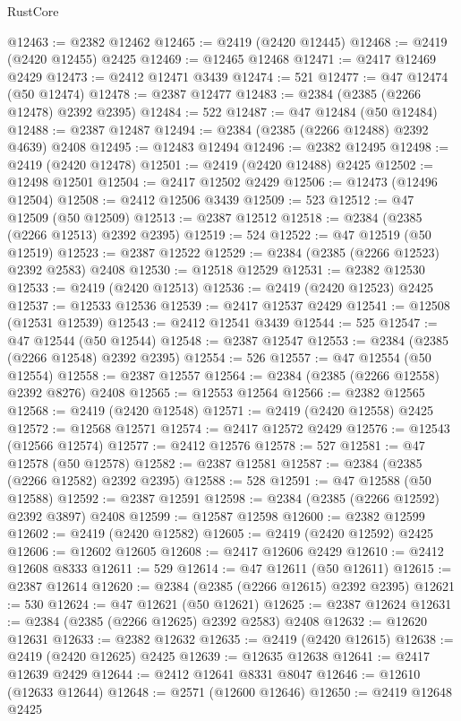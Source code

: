 \begin{lexlean}{RustCore}
\begin{coremodule}
@12463 := @2382 @12462
@12465 := @2419 (@2420 @12445)
@12468 := @2419 (@2420 @12455) @2425
@12469 := @12465 @12468
@12471 := @2417 @12469 @2429
@12473 := @2412 @12471 @3439
@12474 := 521
@12477 := @47 @12474 (@50 @12474)
@12478 := @2387 @12477
@12483 := @2384 (@2385 (@2266 @12478) @2392 @2395)
@12484 := 522
@12487 := @47 @12484 (@50 @12484)
@12488 := @2387 @12487
@12494 := @2384 (@2385 (@2266 @12488) @2392 @4639) @2408
@12495 := @12483 @12494
@12496 := @2382 @12495
@12498 := @2419 (@2420 @12478)
@12501 := @2419 (@2420 @12488) @2425
@12502 := @12498 @12501
@12504 := @2417 @12502 @2429
@12506 := @12473 (@12496 @12504)
@12508 := @2412 @12506 @3439
@12509 := 523
@12512 := @47 @12509 (@50 @12509)
@12513 := @2387 @12512
@12518 := @2384 (@2385 (@2266 @12513) @2392 @2395)
@12519 := 524
@12522 := @47 @12519 (@50 @12519)
@12523 := @2387 @12522
@12529 := @2384 (@2385 (@2266 @12523) @2392 @2583) @2408
@12530 := @12518 @12529
@12531 := @2382 @12530
@12533 := @2419 (@2420 @12513)
@12536 := @2419 (@2420 @12523) @2425
@12537 := @12533 @12536
@12539 := @2417 @12537 @2429
@12541 := @12508 (@12531 @12539)
@12543 := @2412 @12541 @3439
@12544 := 525
@12547 := @47 @12544 (@50 @12544)
@12548 := @2387 @12547
@12553 := @2384 (@2385 (@2266 @12548) @2392 @2395)
@12554 := 526
@12557 := @47 @12554 (@50 @12554)
@12558 := @2387 @12557
@12564 := @2384 (@2385 (@2266 @12558) @2392 @8276) @2408
@12565 := @12553 @12564
@12566 := @2382 @12565
@12568 := @2419 (@2420 @12548)
@12571 := @2419 (@2420 @12558) @2425
@12572 := @12568 @12571
@12574 := @2417 @12572 @2429
@12576 := @12543 (@12566 @12574)
@12577 := @2412 @12576
@12578 := 527
@12581 := @47 @12578 (@50 @12578)
@12582 := @2387 @12581
@12587 := @2384 (@2385 (@2266 @12582) @2392 @2395)
@12588 := 528
@12591 := @47 @12588 (@50 @12588)
@12592 := @2387 @12591
@12598 := @2384 (@2385 (@2266 @12592) @2392 @3897) @2408
@12599 := @12587 @12598
@12600 := @2382 @12599
@12602 := @2419 (@2420 @12582)
@12605 := @2419 (@2420 @12592) @2425
@12606 := @12602 @12605
@12608 := @2417 @12606 @2429
@12610 := @2412 @12608 @8333
@12611 := 529
@12614 := @47 @12611 (@50 @12611)
@12615 := @2387 @12614
@12620 := @2384 (@2385 (@2266 @12615) @2392 @2395)
@12621 := 530
@12624 := @47 @12621 (@50 @12621)
@12625 := @2387 @12624
@12631 := @2384 (@2385 (@2266 @12625) @2392 @2583) @2408
@12632 := @12620 @12631
@12633 := @2382 @12632
@12635 := @2419 (@2420 @12615)
@12638 := @2419 (@2420 @12625) @2425
@12639 := @12635 @12638
@12641 := @2417 @12639 @2429
@12644 := @2412 @12641 @8331 @8047
@12646 := @12610 (@12633 @12644)
@12648 := @2571 (@12600 @12646)
@12650 := @2419 @12648 @2425

\end{coremodule}
\end{lexlean}
